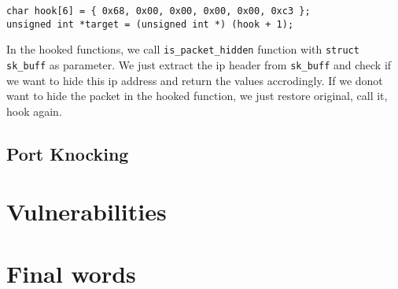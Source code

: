 \documentclass[10pt, letterpaper]{scrartcl}
\begin{document}
\begin{verbatim}
char hook[6] = { 0x68, 0x00, 0x00, 0x00, 0x00, 0xc3 };
unsigned int *target = (unsigned int *) (hook + 1);
\end{verbatim} 

In the hooked functions, we call \texttt{is\_packet\_hidden} function with \texttt{struct sk\_buff} as parameter.
We just extract the ip header from \texttt{sk\_buff} and check if we want to hide this ip address and return the values accrodingly. 
If we donot want to hide the packet in the hooked function, we just restore original, call it, hook again. 
  
\subsection{Port Knocking}


\section{Vulnerabilities}

\section{Final words}
\end{document}
